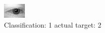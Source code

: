 \begin{figure}[h!]
\begin{center}
\includegraphics[width=0.60\columnwidth]{figures/ID405_class_1_target_2.png}
\end{center}
\caption{ Classification: 1 actual target: 2}
\label{fig:ID405_class_1_target_2}
\end{figure}
